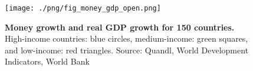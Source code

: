 \begin{figure}[h]
\caption{\label{fig:money_gdp_open} \textbf{Money growth and real GDP growth for 150 countries.} High-income countries: blue circles, medium-income: green squares, and low-income: red triangles. {\tiny Source: Quandl, World Development Indicators, World Bank}}
\hspace*{-.5cm}\texttt{[image: ./png/fig\_money\_gdp\_open.png]}
\end{figure}